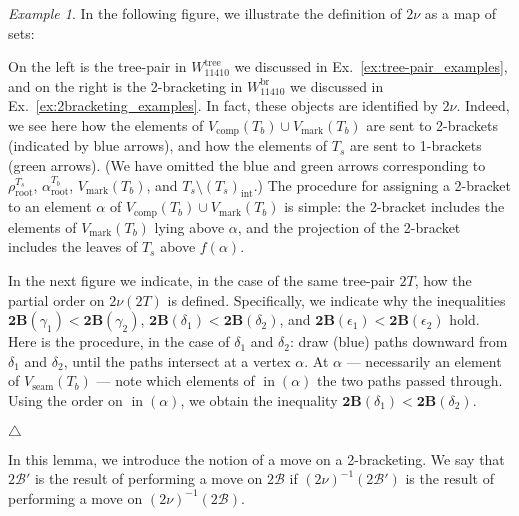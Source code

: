 \documentclass[11pt]{amsart}
\theoremstyle{definition}
\theoremstyle{remark}
\newtheorem{example}[theorem]{Example}
\theoremstyle{plain}
\newcommand{\btB}{{\mathbf{2B}}}
\newcommand{\stB}{2\mathscr{B}}
\newcommand{\on}{\operatorname}
\newcommand{\comp}{C^2}
\renewcommand{\comp}{{\on{comp}}}
\newcommand{\seam}{{\on{seam}}}
\newcommand{\mk}{{\on{mark}}}
\newcommand{\incom}{\on{in}}
\newcommand{\inte}{{\on{int}}}
\renewcommand{\root}{{\on{root}}}
\newcommand{\tree}{{\on{tree}}}
\newcommand{\br}{{\on{br}}}
\newcommand{\eps}{\epsilon}
\begin{document}
\begin{example}
\label{ex:2nu_example}
In the following figure, we illustrate the definition of $2\nu$ as a map of sets:

\begin{figure}[H]
\centering
\def\svgwidth{0.65\columnwidth}

\label{fig:2nu_example}
\end{figure}

\noindent
On the left is the tree-pair in $W_{11410}^\tree$ we discussed in Ex.~\ref{ex:tree-pair_examples}, and on the right is the 2-bracketing in $W_{11410}^\br$ we discussed in Ex.~\ref{ex:2bracketing_examples}.
In fact, these objects are identified by $2\nu$.
Indeed, we see here how the elements of $V_\comp(T_b) \cup V_\mk(T_b)$ are sent to 2-brackets (indicated by blue arrows), and how the elements of $T_s$ are sent to 1-brackets (green arrows).
(We have omitted the blue and green arrows corresponding to $\rho_\root^{T_s}$, $\alpha_\root^{T_b}$, $V_\mk(T_b)$, and $T_s \setminus (T_s)_\inte$.)
The procedure for assigning a 2-bracket to an element $\alpha$ of $V_\comp(T_b) \cup V_\mk(T_b)$ is simple: the 2-bracket includes the elements of $V_\mk(T_b)$ lying above $\alpha$, and the projection of the 2-bracket includes the leaves of $T_s$ above $f(\alpha)$.

In the next figure we indicate, in the case of the same tree-pair $2T$, how the partial order on $2\nu(2T)$ is defined.
Specifically, we indicate why the inequalities $\btB(\gamma_1) < \btB(\gamma_2)$, $\btB(\delta_1) < \btB(\delta_2)$, and $\btB(\eps_1) < \btB(\eps_2)$ hold.
Here is the procedure, in the case of $\delta_1$ and $\delta_2$: draw (blue) paths downward from $\delta_1$ and $\delta_2$, until the paths intersect at a vertex $\alpha$.
At $\alpha$ --- necessarily an element of $V_\seam(T_b)$ --- note which elements of $\incom(\alpha)$ the two paths passed through.
Using the order on $\incom(\alpha)$, we obtain the inequality $\btB(\delta_1) < \btB(\delta_2)$.

\begin{figure}[H]
\centering
\def\svgwidth{0.65\columnwidth}

\label{fig:2nu_order_example}
\end{figure}
\null\hfill$\triangle$
\end{example}

In this lemma, we introduce the notion of a move on a 2-bracketing.
We say that $\stB'$ is the result of performing a move on $\stB$ if $(2\nu)^{-1}(\stB')$ is the result of performing a move on $(2\nu)^{-1}(\stB)$.
\end{document}
